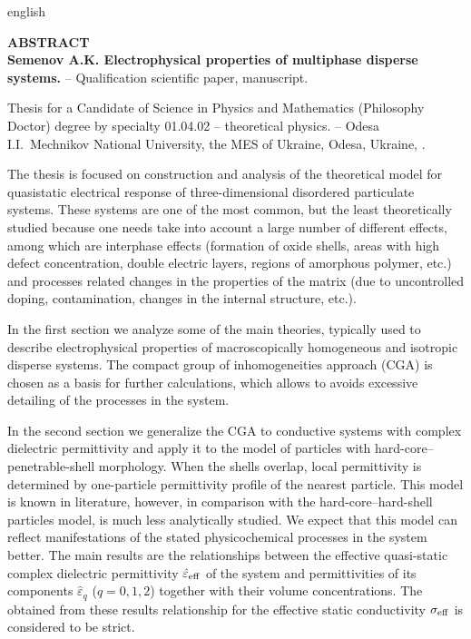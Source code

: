 \begin{otherlanguage*}{english}
\begin{center}
    {\normalfont \textbf{
    	ABSTRACT\\
    	Semenov A.K. Electrophysical properties of multiphase disperse systems.} -- Qualification scientific paper, manuscript.}
\end{center}
\vskip 5pt

Thesis for a Candidate of Science in Physics and Mathematics (Philosophy Doctor) degree by specialty 01.04.02 -- theoretical physics. -- Odesa I.I.~Mechnikov National University, the MES of Ukraine, Odesa, Ukraine, \the\year.

\vskip 5pt



The thesis is focused on construction and analysis of the theoretical model for quasistatic electrical response of three-dimensional disordered particulate systems. These systems are one of the most common, but the least theoretically studied because one needs take into account a large number of different effects, among which are interphase effects (formation of oxide shells, areas with high defect concentration, double electric layers, regions of amorphous polymer, etc.) and processes related changes in the properties of the matrix (due to uncontrolled doping, contamination, changes in the internal structure, etc.).

In the first section we analyze some of the main theories, typically used to describe electrophysical properties of macroscopically homogeneous and isotropic disperse systems. The compact group of inhomogeneities approach (CGA) is chosen as a basis for further calculations, which allows to avoids excessive detailing of the processes in the system.

In the second section we generalize the CGA to conductive systems with complex dielectric permittivity and apply it to the model of particles with hard-core--penetrable-shell morphology. When the shells overlap, local permittivity is determined by one-particle permittivity profile of the nearest particle.
This model is known in literature, however, in comparison with the   hard-core--hard-shell particles model, is much less analytically studied. We expect that this model can reflect manifestations of the stated physicochemical processes in the system better.
The main results are the relationships between the effective quasi-static complex dielectric permittivity $ \hat {\varepsilon} _ {\rm eff} $ of the system and permittivities of its components $ \hat {\varepsilon} _ {q} $ ($ q = 0,1,2 $) together with their volume concentrations. The obtained from these results relationship for the effective static conductivity $ \sigma _ {\rm eff} $ is considered to be strict.


\end{otherlanguage*}
